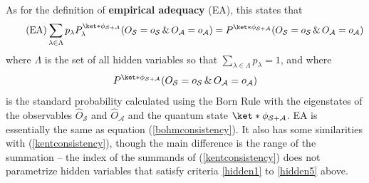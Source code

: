 \documentclass[12pt]{report}
\begin{document}
As for the definition of \textbf{empirical adequacy} (EA),  this states that
\begin{equation}\tag{EA}\label{adeq}
	\sum_{\lambda\in\Lambda}p_\lambda P_\lambda^{\ket*{\phi}_{\mathcal{S}+\mathcal{A}}}(O_\mathcal{S}=o_\mathcal{S}\, \& \,O_\mathcal{A}=o_\mathcal{A})=P^{\ket*{\phi}_{\mathcal{S}+\mathcal{A}}}(O_\mathcal{S}=o_\mathcal{S}\, \& \,O_\mathcal{A}=o_\mathcal{A})
\end{equation}
where $\Lambda$ is the set of all hidden variables so that $\sum_{\lambda\in\Lambda} p_\lambda = 1$, %
%
 and where 
$$P^{\ket*{\phi}_{\mathcal{S}+\mathcal{A}}}(O_\mathcal{S}=o_\mathcal{S}\, \& \,O_\mathcal{A}=o_\mathcal{A})$$ %
%
 is the standard probability calculated using the Born Rule with the eigenstates of the observables $\hat{O}_\mathcal{S}$ and $\hat{O}_\mathcal{A}$ and the quantum state $\ket*{\phi}_{\mathcal{S}+\mathcal{A}}$. EA is essentially the same as equation (\ref{bohmconsistency}). It also has some similarities with (\ref{kentconsistency}), though the main difference is the range of the summation -- the index of the summands of (\ref{kentconsistency}) does not parametrize hidden variables that satisfy criteria \ref{hidden1} to \ref{hidden5} above.
\end{document}
